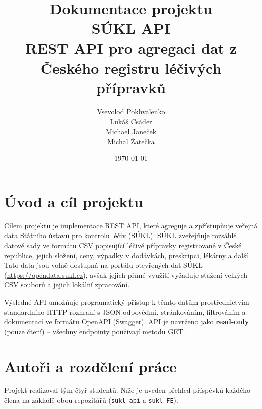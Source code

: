\documentclass[12pt,a4paper]{article}
\title{
  \vspace{2cm}
  {\Large Dokumentace projektu}\\[0.5em]
  {\LARGE \textbf{SÚKL API}}\\[0.5em]
  {\large REST API pro agregaci dat z Českého registru léčivých přípravků}\\[2em]
}
\author{
  Vsevolod Pokhvalenko \\
  Lukáš Csáder \\
  Michael Janeček \\
  Michal Žatečka
}
\date{\today}
\begin{document}
\maketitle
\thispagestyle{empty}
\vspace{2cm}

\tableofcontents
\newpage

\section{Úvod a cíl projektu}

Cílem projektu je implementace REST API, které agreguje a zpřístupňuje veřejná data Státního ústavu pro kontrolu léčiv (SÚKL). SÚKL zveřejňuje rozsáhlé datové sady ve formátu CSV popisující léčivé přípravky registrované v České republice, jejich složení, ceny, výpadky v dodávkách, preskripci, lékárny a další. Tato data jsou volně dostupná na portálu otevřených dat SÚKL (\url{https://opendata.sukl.cz}), avšak jejich přímé využití vyžaduje stažení velkých CSV souborů a jejich lokální zpracování.

Výsledné API umožňuje programatický přístup k těmto datům prostřednictvím standardního HTTP rozhraní s JSON odpověďmi, stránkováním, filtrováním a dokumentací ve formátu OpenAPI (Swagger). API je navrženo jako \textbf{read-only} (pouze čtení) -- všechny endpointy používají metodu GET.

\section{Autoři a rozdělení práce}

Projekt realizoval tým čtyř studentů. Níže je uveden přehled příspěvků každého člena na základě obou repozitářů (\texttt{sukl-api} a \texttt{sukl-FE}).
\end{document}
